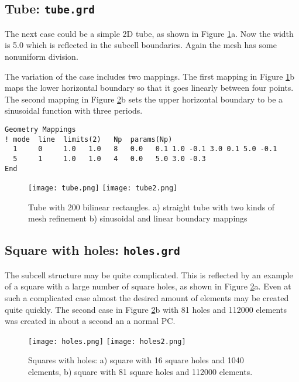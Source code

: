 \subsection*{Tube: \texttt{tube.grd}}

The next case could be a simple 2D tube, as shown in Figure \ref{fg:pic2}a. 
Now the width is 5.0 which is reflected in 
the subcell boundaries. Again the mesh has some nonuniform division.


%
The variation of the case includes two mappings. The first mapping in Figure \ref{fg:pic2}b
maps the lower horizontal boundary so that it goes linearly between four points.
The second mapping in Figure \ref{fg:pic3}b sets the upper horizontal boundary 
to be a sinusoidal function with three periods.\\

\begin{verbatim}
Geometry Mappings 
! mode  line  limits(2)   Np  params(Np)
  1     0     1.0   1.0   8   0.0	0.1 1.0 -0.1 3.0 0.1 5.0 -0.1 
  5     1     1.0   1.0   4   0.0	5.0 3.0 -0.3
End 
\end{verbatim}
%
\begin{figure}[H]
\centering
\texttt{[image: tube.png]} 
\texttt{[image: tube2.png]}
\caption{Tube with 200 bilinear rectangles.
a) straight tube with 
two kinds of mesh refinement
b) sinusoidal and linear boundary mappings}
\label{fg:pic2}
\end{figure}

\subsection*{Square with holes: \texttt{holes.grd}}

The subcell structure may be quite complicated. This is reflected by an
example of a square with a large number of square holes, as shown in 
Figure \ref{fg:pic3}a. Even at such a complicated
case almost the desired amount of elements may be created quite quickly.
The second case in Figure \ref{fg:pic3}b with 81 holes and 112000 
elements was created in about a second an a normal PC.


%
\begin{figure}[H]
\centering
\texttt{[image: holes.png]}
\texttt{[image: holes2.png]}
\caption{Squares with holes: 
a) square with 16 square holes and 1040 elements,
b) square with 81 square holes and 112000 elements.}
\label{fg:pic3}
\end{figure}


